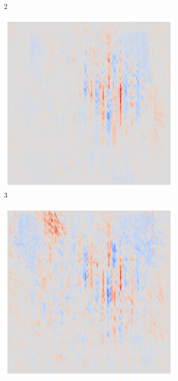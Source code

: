 \begin{figure}[ht!]
\begin{subfigure}{0.095\linewidth}
        \caption{2}
    \end{subfigure}\hfill%
    \begin{subfigure}{0.095\linewidth}
        \centering
        \includegraphics[height=1\linewidth]{01-images/05-resultate/uap_efficientnet/uap0-efficientnetv2m-mri-n200-robustificationslevel3.png}
        \caption{3}
    \end{subfigure}\hfill%
    \begin{subfigure}{0.095\linewidth}
        \centering
        \includegraphics[height=1\linewidth]{01-images/05-resultate/uap_efficientnet/uap0-efficientnetv2m-mri-n200-robustificationslevel4.png}

\end{subfigure}
\end{figure}
